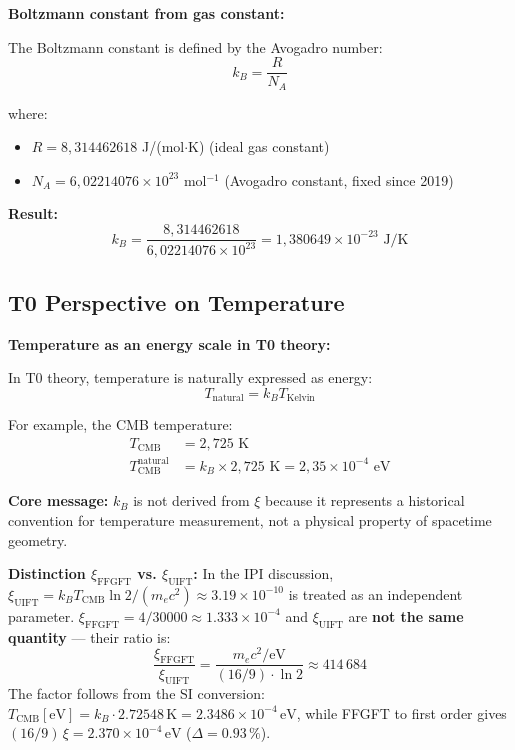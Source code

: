 	\begin{keyresult}
		\textbf{Boltzmann constant from gas constant:}
		
		The Boltzmann constant is defined by the Avogadro number:
		\begin{equation}
			k_B = \frac{R}{N_A}
		\end{equation}
		
		where:
		\begin{itemize}
			\item $R = 8{,}314462618$ J/(mol$\cdot$K) (ideal gas constant)
			\item $N_A = 6{,}02214076 \times 10^{23}$ mol$^{-1}$ (Avogadro constant, fixed since 2019)
		\end{itemize}
		
		\textbf{Result:}
		\begin{equation}
			k_B = \frac{8{,}314462618}{6{,}02214076 \times 10^{23}} = 1{,}380649 \times 10^{-23} \text{ J/K}
		\end{equation}
	\end{keyresult}
	
	\subsection{T0 Perspective on Temperature}
	
	\begin{insight}
		\textbf{Temperature as an energy scale in T0 theory:}
		
		In T0 theory, temperature is naturally expressed as energy:
		\begin{equation}
			T_{\text{natural}} = k_B T_{\text{Kelvin}}
		\end{equation}
		
		For example, the CMB temperature:
		\begin{align}
			T_{\text{CMB}} &= 2{,}725 \text{ K} \\
			T_{\text{CMB}}^{\text{natural}} &= k_B \times 2{,}725 \text{ K} = 2{,}35 \times 10^{-4} \text{ eV}
		\end{align}
		
		\textbf{Core message:} $k_B$ is not derived from $\xi$ because it represents a historical convention for temperature measurement, not a physical property of spacetime geometry.

		\textbf{Distinction $\xi_{\text{FFGFT}}$ vs. $\xi_{\text{UIFT}}$:}
		In the IPI discussion, $\xi_{\text{UIFT}} = k_B T_{\text{CMB}} \ln 2 / (m_e c^2) \approx 3.19 \times 10^{-10}$ is treated as an independent parameter.
		$\xi_{\text{FFGFT}} = 4/30000 \approx 1.333 \times 10^{-4}$ and $\xi_{\text{UIFT}}$ are \textbf{not the same quantity} — their ratio is:
		\begin{equation}
			\frac{\xi_{\text{FFGFT}}}{\xi_{\text{UIFT}}} = \frac{m_e c^2 / \text{eV}}{(16/9) \cdot \ln 2} \approx 414\,684
		\end{equation}
		The factor follows from the SI conversion: $T_{\text{CMB}}[\text{eV}] = k_B \cdot 2.72548\,\text{K} = 2.3486 \times 10^{-4}\,\text{eV}$, while FFGFT to first order gives $(16/9)\,\xi = 2.370 \times 10^{-4}\,\text{eV}$ ($\Delta = 0.93\,\%$).
	\end{insight}
	
